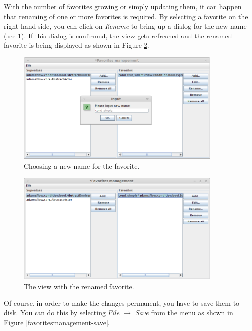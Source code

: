 \clearpage
{}
With the number of favorites growing or simply updating them, it can happen
that renaming of one or more favorites is required. By selecting a favorite
on the right-hand side, you can click on \textit{Rename} to bring up a dialog
for the new name (see \ref{favoritesmanagement-rename1}). If this dialog
is confirmed, the view gets refreshed and the renamed favorite is being
displayed as shown in Figure \ref{favoritesmanagement-rename2}.

\begin{figure}[htb]
  \centering
  \includegraphics[width=10.0cm]{images/favoritesmanagement-rename1.png}
  \caption{Choosing a new name for the favorite.}
  \label{favoritesmanagement-rename1}
\end{figure}

\begin{figure}[htb]
  \centering
  \includegraphics[width=10.0cm]{images/favoritesmanagement-rename2.png}
  \caption{The view with the renamed favorite.}
  \label{favoritesmanagement-rename2}
\end{figure}

\clearpage
{}
Of course, in order to make the changes permanent, you have to save them to 
disk. You can do this by selecting \textit{File $\rightarrow$ Save} from the
menu as shown in Figure \ref{favoritesmanagement-save}.

